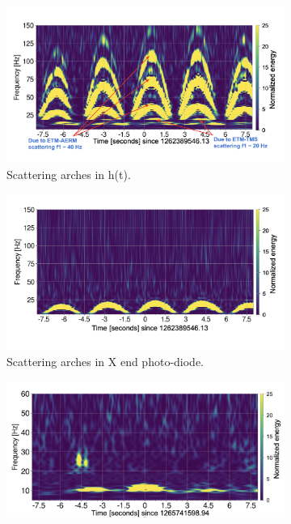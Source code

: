 \documentclass[12pt]{iopart}
\begin{document}
\begin{figure}[h]
\captionsetup[subfigure]{font=scriptsize,labelfont=scriptsize}
   \centering
    \begin{subfigure}[b]{0.45\textwidth}
        \centering
         \includegraphics[width= \textwidth]{1262389546darm_new.png}
         \caption{Scattering arches in h(t).}
         \label{fig:1262darm}
    \end{subfigure}
    \begin{subfigure}[b]{0.45\textwidth}
        \centering
         \includegraphics[width =\textwidth]{1262389546trans_new.png}
         \caption{Scattering arches in X end photo-diode.}
         \label{fig:1262trans}
     \end{subfigure}
     \par\bigskip
      \begin{subfigure}[b]{0.45\textwidth}
        \centering
         \includegraphics[width= \textwidth]{post_r0_darmomeg2.png}

\end{subfigure}
\end{figure}
\end{document}
